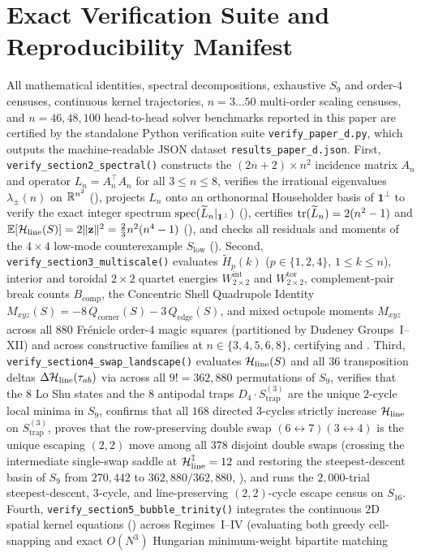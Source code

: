 \section{Exact Verification Suite and Reproducibility Manifest}
\label{sec:appendix}

All mathematical identities, spectral decompositions, exhaustive $S_9$ and order-$4$ censuses, continuous kernel trajectories, $n = 3\dots 50$ multi-order scaling censuses, and $n = 46, 48, 100$ head-to-head solver benchmarks reported in this paper are certified by the standalone Python verification suite \texttt{verify\_paper\_d.py}, which outputs the machine-readable JSON dataset \texttt{results\_paper\_d.json}. First, \texttt{verify\_section2\_spectral()} constructs the $(2n+2)\times n^2$ incidence matrix $A_n$ and operator $L_n = A_n^\top A_n$ for all $3 \le n \le 8$, verifies the irrational eigenvalues $\lambda_\pm(n)$ on $\mathbb{R}^{n^2}$ (), projects $L_n$ onto an orthonormal Householder basis of $\mathbf{1}^\perp$ to verify the exact integer spectrum $\operatorname{spec}(\widetilde{L}_n|_{\mathbf{1}^\perp})$ (), certifies $\operatorname{tr}(\widetilde{L}_n) = 2(n^2-1)$ and $\mathbb{E}[\mathcal{H}_{\mathrm{line}}(S)] = 2\|\mathbf{z}\|^2 = \frac{2}{3}n^2(n^4-1)$ (), and checks all residuals and moments of the $4\times 4$ low-mode counterexample $S_{\mathrm{low}}$ (). Second, \texttt{verify\_section3\_multiscale()} evaluates $\widetilde{H}_p(k)$ ($p\in\{1,2,4\}$, $1\le k\le n$), interior and toroidal $2\times 2$ quartet energies $W_{2\times 2}^{\mathrm{int}}$ and $W_{2\times 2}^{\mathrm{tor}}$, complement-pair break counts $B_{\mathrm{comp}}$, the Concentric Shell Quadrupole Identity $M_{xyz}(S) = -8\,Q_{\mathrm{corner}}(S) - 3\,Q_{\mathrm{edge}}(S)$, and mixed octupole moments $M_{xyz}$ across all $880$ Fr\'enicle order-$4$ magic squares (partitioned by Dudeney Groups~I--XII) and across constructive families at $n \in \{3,4,5,6,8\}$, certifying  and . Third, \texttt{verify\_section4\_swap\_landscape()} evaluates $\mathcal{H}_{\mathrm{line}}(S)$ and all $36$ transposition deltas $\Delta\mathcal{H}_{\mathrm{line}}(\tau_{ab})$ via  across all $9! = 362{,}880$ permutations of $S_9$, verifies that the $8$ Lo Shu states and the $8$ antipodal traps $D_4\cdot S_{\mathrm{trap}}^{(3)}$ are the unique $2$-cycle local minima in $S_9$, confirms that all $168$ directed $3$-cycles strictly increase $\mathcal{H}_{\mathrm{line}}$ on $S_{\mathrm{trap}}^{(3)}$, proves that the row-preserving double swap $(6\leftrightarrow 7)(3\leftrightarrow 4)$ is the unique escaping $(2,2)$ move among all $378$ disjoint double swaps (crossing the intermediate single-swap saddle at $\mathcal{H}_{\mathrm{line}}^\ddagger = 12$ and restoring the steepest-descent basin of $S_9$ from $270{,}442$ to $362{,}880 / 362{,}880$, ), and runs the $2{,}000$-trial steepest-descent, $3$-cycle, and line-preserving $(2,2)$-cycle escape census on $S_{16}$. Fourth, \texttt{verify\_section5\_bubble\_trinity()} integrates the continuous $2\mathrm{D}$ spatial kernel equations () across Regimes~I--IV (evaluating both greedy cell-snapping and exact $O(N^3)$ Hungarian minimum-weight bipartite matching 